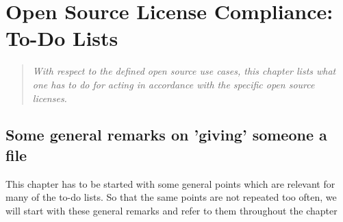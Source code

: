 %
%
%
%
%


\chapter{Open Source License Compliance: To-Do Lists}

\footnotesize
\begin{quote}\itshape
With respect to the defined open source use cases, this chapter lists what one
has to do for acting in accordance with the specific open source licenses.
\end{quote}
\normalsize{}

\section{Some general remarks on 'giving' someone a file}

This chapter has to be started with some general points which are relevant for
many of the to-do lists. So that the same points are not repeated too often, we
will start with these general remarks and refer to them throughout the chapter

